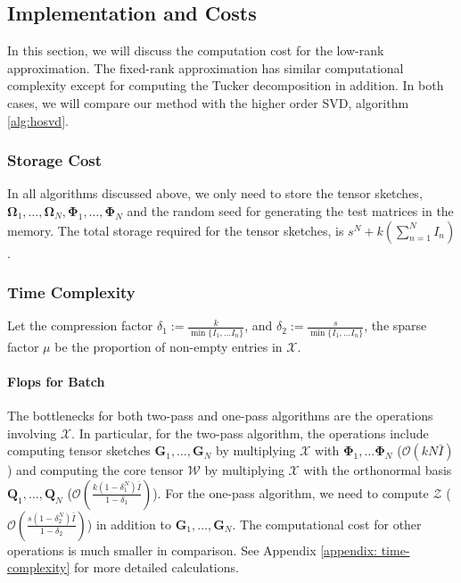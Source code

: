 \subsection{Implementation and Costs} 

In this section, we will discuss the computation cost for the low-rank approximation. The fixed-rank approximation has similar computational complexity except for computing the Tucker decomposition in addition. In both cases, we will compare our method with the higher order SVD, algorithm \ref{alg:hosvd}.
\subsubsection{Storage Cost}
In all algorithms discussed above, we only need to store the tensor sketches, $\mathbf{\Omega}_1, \dots, \mathbf{\Omega}_N, \mathbf{\Phi}_1, \dots, \mathbf{\Phi}_N$ and the random seed for generating the test matrices in the memory. The total storage required for the tensor sketches,  is $s^N+k(\sum_{n = 1}^N I_n)$. 
\subsubsection{Time Complexity}
Let the compression factor $\delta_1:= \frac{k}{\min\{I_1, \dots I_n\}}$, and $\delta_2 := \frac{s}{\min\{I_1, \dots I_n \}}$, the sparse factor $\mu$ be the proportion of non-empty entries in $\mathscr{X}$. 
\paragraph{Flops for Batch} 
The bottlenecks for both two-pass and one-pass algorithms are the operations involving $\mathscr{X}$. In particular, for the two-pass algorithm, the operations include computing tensor sketches $\mathbf{G}_1, \dots, \mathbf{G}_N$ by multiplying $\mathscr{X}$ with $\mathbf{\Phi}_1, \dots \mathbf{\Phi}_N$ ($\mathcal{O}(kN\bar{I})$) and computing the core tensor $\mathscr{W}$ by multiplying $\mathscr{X}$ with the orthonormal basis $\mathbf{Q}_1, \dots, \mathbf{Q}_N$ ($\mathcal{O}(\frac{k(1-\delta_1^N)\bar{I}}{1-\delta_1})$). For the one-pass algorithm, we need to compute $\mathscr{Z}$ ($\mathcal{O}(\frac{s(1-\delta_2^N)\bar{I}}{1 - \delta_2})$) in addition to $\mathbf{G}_1, \dots, \mathbf{G}_N$. The computational cost for other operations is much smaller in comparison. See Appendix \ref{appendix: time-complexity} for more detailed calculations. 

